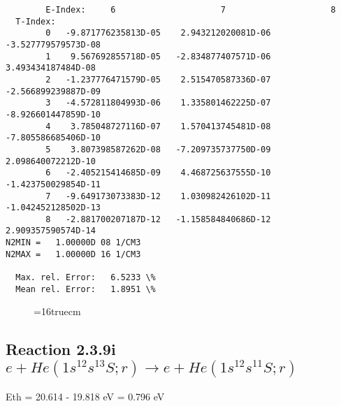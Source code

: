 \documentclass[12pt,dvipdfmx]{article}
\begin{document}
\begin{small}
\begin{verbatim}
        E-Index:     6                     7                     8
  T-Index:
        0   -9.871776235813D-05    2.943212020081D-06   -3.527779579573D-08
        1    9.567692855718D-05   -2.834877407571D-06    3.493434187484D-08
        2   -1.237776471579D-05    2.515470587336D-07   -2.566899239887D-09
        3   -4.572811804993D-06    1.335801462225D-07   -8.926601447859D-10
        4    3.785048727116D-07    1.570413745481D-08   -7.805586685406D-10
        5    3.807398587262D-08   -7.209735737750D-09    2.098640072212D-10
        6   -2.405215414685D-09    4.468725637555D-10   -1.423750029854D-11
        7   -9.649173073383D-12    1.030982426102D-11   -1.042452128502D-13
        8   -2.881700207187D-12   -1.158584840686D-12    2.909357590574D-14
N2MIN =   1.00000D 08 1/CM3
N2MAX =   1.00000D 16 1/CM3

  Max. rel. Error:   6.5233 \%
  Mean rel. Error:   1.8951 \%

\end{verbatim}\end{small}
\begin{figure} \label{2.3.9h}
\epsfxsize=16truecm
\end{figure}
\newpage



\subsection{
Reaction 2.3.9i $ e + He(1s^12s^13S;r) \rightarrow e + He(1s^12s^11S;r) $
}
Eth = 20.614 - 19.818 eV = 0.796 eV
\end{document}
